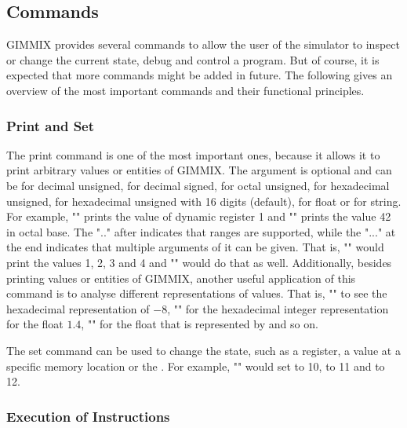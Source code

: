 
\subsection{Commands}

GIMMIX provides several commands to allow the user of the simulator to inspect or change the current state, debug and control a program. But of course, it is expected that more commands might be added in future. The following gives an overview of the most important commands and their functional principles.

\subsubsection{Print and Set}

\noindent The print command is one of the most important ones, because it allows it to print arbitrary values or entities of GIMMIX. The argument  is optional and can be  for decimal unsigned,  for decimal signed,  for octal unsigned,  for hexadecimal unsigned,  for hexadecimal unsigned with 16 digits (default),  for float or  for string. For example, "" prints the value of dynamic register 1 and "" prints the value 42 in octal base. The ".." after  indicates that ranges are supported, while the "..." at the end indicates that multiple arguments of it can be given. That is, "" would print the values 1, 2, 3 and 4 and "" would do that as well. Additionally, besides printing values or entities of GIMMIX, another useful application of this command is to analyse different representations of values. That is, "" to see the hexadecimal representation of $-8$, "" for the hexadecimal integer representation for the float $1.4$, "" for the float that is represented by  and so on.

\noindent The set command can be used to change the state, such as a register, a value at a specific memory location or the . For example, "" would set  to 10,  to 11 and  to 12.

\subsubsection{Execution of Instructions}

